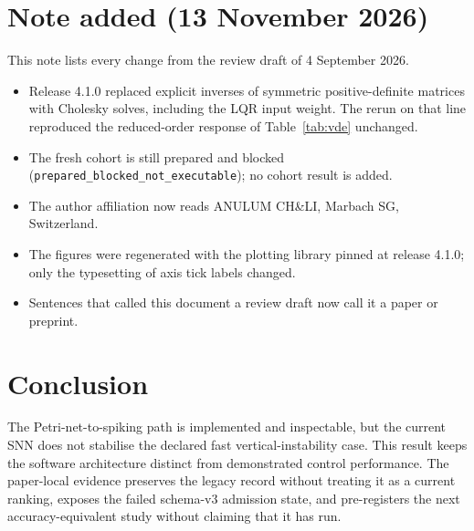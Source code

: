 \documentclass[11pt]{article}
\newcommand{\code}[1]{\texttt{#1}}
\begin{document}
\section*{Note added (13 November 2026)}

This note lists every change from the review draft of 4 September 2026.
\begin{itemize}
  \item Release 4.1.0 replaced explicit inverses of symmetric
        positive-definite matrices with Cholesky solves, including the LQR
        input weight.  The rerun on that line reproduced the reduced-order
        response of Table~\ref{tab:vde} unchanged.
  \item The fresh cohort is still prepared and blocked
        (\code{prepared\_blocked\_not\_executable}); no cohort result is
        added.
  \item The author affiliation now reads ANULUM CH\&LI, Marbach SG,
        Switzerland.
  \item The figures were regenerated with the plotting library pinned at
        release 4.1.0; only the typesetting of axis tick labels changed.
  \item Sentences that called this document a review draft now call it a
        paper or preprint.
\end{itemize}

\section{Conclusion}

The Petri-net-to-spiking path is implemented and inspectable, but the current
SNN does not stabilise the declared fast vertical-instability case.  This result
keeps the software architecture distinct from demonstrated control performance.
The paper-local evidence preserves the legacy record without treating it as a
current ranking, exposes the failed schema-v3 admission state, and pre-registers
the next accuracy-equivalent study without claiming that it has run.


\end{document}
